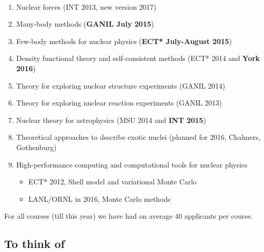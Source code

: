 \documentclass[%
twoside,                 %
final,                   %
10pt]{article}
\begin{document}
\paragraph{}
\begin{enumerate}
\item Nuclear forces (INT 2013, new version 2017)

\item Many-body methods (\textbf{GANIL July 2015})

\item Few-body methods for nuclear physics (\textbf{ECT* July-August 2015})

\item Density functional theory and self-consistent methods (ECT* 2014 and \textbf{York 2016})

\item Theory for exploring nuclear structure experiments (GANIL 2014)

\item Theory for exploring nuclear reaction experiments (GANIL 2013)

\item Nuclear theory for astrophysics (MSU 2014 and \textbf{INT 2015})

\item Theoretical approaches to describe  exotic nuclei (planned for 2016, Chalmers, Gothenburg)

\item High-performance computing and computational tools for nuclear physics
\begin{itemize}

  \item ECT* 2012, Shell model and variational Monte Carlo

  \item LANL/ORNL in 2016, Monte Carlo methods 
\end{itemize}

\noindent
\end{enumerate}

\noindent
For all courses (till this year) we have had on average 40 applicants per course.




\subsection*{To think of}

\end{document}
